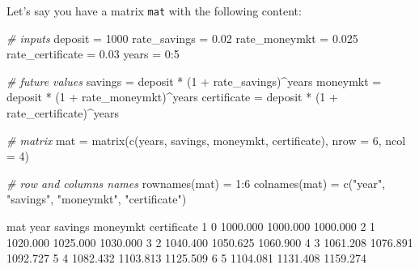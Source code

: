 \documentclass[
]{book}
\newenvironment{Shaded}{\begin{snugshade}}{\end{snugshade}}
\newcommand{\AttributeTok}[1]{\textcolor[rgb]{0.77,0.63,0.00}{#1}}
\newcommand{\CommentTok}[1]{\textcolor[rgb]{0.56,0.35,0.01}{\textit{#1}}}
\newcommand{\DecValTok}[1]{\textcolor[rgb]{0.00,0.00,0.81}{#1}}
\newcommand{\FloatTok}[1]{\textcolor[rgb]{0.00,0.00,0.81}{#1}}
\newcommand{\FunctionTok}[1]{\textcolor[rgb]{0.00,0.00,0.00}{#1}}
\newcommand{\NormalTok}[1]{#1}
\newcommand{\OtherTok}[1]{\textcolor[rgb]{0.56,0.35,0.01}{#1}}
\newcommand{\SpecialCharTok}[1]{\textcolor[rgb]{0.00,0.00,0.00}{#1}}
\newcommand{\StringTok}[1]{\textcolor[rgb]{0.31,0.60,0.02}{#1}}
\begin{document}
Let's say you have a matrix \texttt{mat} with the following content:

\begin{Shaded}
\begin{Highlighting}[]
\CommentTok{\# inputs}
\NormalTok{deposit }\OtherTok{=} \DecValTok{1000}
\NormalTok{rate\_savings }\OtherTok{=} \FloatTok{0.02}
\NormalTok{rate\_moneymkt }\OtherTok{=} \FloatTok{0.025}
\NormalTok{rate\_certificate }\OtherTok{=} \FloatTok{0.03}
\NormalTok{years }\OtherTok{=} \DecValTok{0}\SpecialCharTok{:}\DecValTok{5}

\CommentTok{\# future values}
\NormalTok{savings }\OtherTok{=}\NormalTok{ deposit }\SpecialCharTok{*}\NormalTok{ (}\DecValTok{1} \SpecialCharTok{+}\NormalTok{ rate\_savings)}\SpecialCharTok{\^{}}\NormalTok{years}
\NormalTok{moneymkt }\OtherTok{=}\NormalTok{ deposit }\SpecialCharTok{*}\NormalTok{ (}\DecValTok{1} \SpecialCharTok{+}\NormalTok{ rate\_moneymkt)}\SpecialCharTok{\^{}}\NormalTok{years}
\NormalTok{certificate }\OtherTok{=}\NormalTok{ deposit }\SpecialCharTok{*}\NormalTok{ (}\DecValTok{1} \SpecialCharTok{+}\NormalTok{ rate\_certificate)}\SpecialCharTok{\^{}}\NormalTok{years}

\CommentTok{\# matrix}
\NormalTok{mat }\OtherTok{=} \FunctionTok{matrix}\NormalTok{(}\FunctionTok{c}\NormalTok{(years, savings, moneymkt, certificate), }\AttributeTok{nrow =} \DecValTok{6}\NormalTok{, }\AttributeTok{ncol =} \DecValTok{4}\NormalTok{)}

\CommentTok{\# row and columns names}
\FunctionTok{rownames}\NormalTok{(mat) }\OtherTok{=} \DecValTok{1}\SpecialCharTok{:}\DecValTok{6}
\FunctionTok{colnames}\NormalTok{(mat) }\OtherTok{=} \FunctionTok{c}\NormalTok{(}\StringTok{"year"}\NormalTok{, }\StringTok{"savings"}\NormalTok{, }\StringTok{"moneymkt"}\NormalTok{, }\StringTok{"certificate"}\NormalTok{)}

\NormalTok{mat}
\NormalTok{  year  savings moneymkt certificate}
\DecValTok{1}    \DecValTok{0} \FloatTok{1000.000} \FloatTok{1000.000}    \FloatTok{1000.000}
\DecValTok{2}    \DecValTok{1} \FloatTok{1020.000} \FloatTok{1025.000}    \FloatTok{1030.000}
\DecValTok{3}    \DecValTok{2} \FloatTok{1040.400} \FloatTok{1050.625}    \FloatTok{1060.900}
\DecValTok{4}    \DecValTok{3} \FloatTok{1061.208} \FloatTok{1076.891}    \FloatTok{1092.727}
\DecValTok{5}    \DecValTok{4} \FloatTok{1082.432} \FloatTok{1103.813}    \FloatTok{1125.509}
\DecValTok{6}    \DecValTok{5} \FloatTok{1104.081} \FloatTok{1131.408}    \FloatTok{1159.274}
\end{Highlighting}
\end{Shaded}
\end{document}
